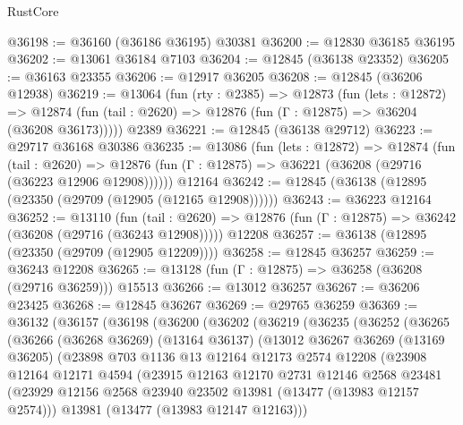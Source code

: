\begin{lexlean}{RustCore}
\begin{coremodule}
@36198 := @36160 (@36186 @36195) @30381
@36200 := @12830 @36185 @36195
@36202 := @13061 @36184 @7103
@36204 := @12845 (@36138 @23352)
@36205 := @36163 @23355
@36206 := @12917 @36205
@36208 := @12845 (@36206 @12938)
@36219 := @13064
    (fun (rty : @2385) =>
    @12873
      (fun (lets : @12872) =>
      @12874 (fun (tail : @2620) => @12876 (fun (Γ : @12875) => @36204 (@36208 @36173)))))
    @2389
@36221 := @12845 (@36138 @29712)
@36223 := @29717 @36168 @30386
@36235 := @13086
    (fun (lets : @12872) =>
    @12874
      (fun (tail : @2620) =>
      @12876 (fun (Γ : @12875) => @36221 (@36208 (@29716 (@36223 @12906 @12908))))))
    @12164
@36242 := @12845 (@36138 (@12895 (@23350 (@29709 (@12905 (@12165 @12908))))))
@36243 := @36223 @12164
@36252 := @13110
    (fun (tail : @2620) => @12876 (fun (Γ : @12875) => @36242 (@36208 (@29716 (@36243 @12908)))))
    @12208
@36257 := @36138 (@12895 (@23350 (@29709 (@12905 @12209))))
@36258 := @12845 @36257
@36259 := @36243 @12208
@36265 := @13128 (fun (Γ : @12875) => @36258 (@36208 (@29716 @36259))) @15513
@36266 := @13012 @36257
@36267 := @36206 @23425
@36268 := @12845 @36267
@36269 := @29765 @36259
@36369 := @36132
    (@36157
      (@36198
        (@36200
          (@36202
            (@36219
              (@36235
                (@36252
                  (@36265
                    (@36266
                      (@36268 @36269)
                      (@13164 @36137)
                      (@13012
                        @36267
                        @36269
                        (@13169 @36205)
                        (@23898
                          @703
                          @1136
                          @13
                          @12164
                          @12173
                          @2574
                          @12208
                          (@23908
                            @12164
                            @12171
                            @4594
                            (@23915
                              @12163
                              @12170
                              @2731
                              @12146
                              @2568
                              @23481
                              (@23929
                                @12156
                                @2568
                                @23940
                                @23502
                                @13981
                                (@13477 (@13983 @12157 @2574)))
                              @13981
                              (@13477 (@13983 @12147 @12163)))

\end{coremodule}
\end{lexlean}
